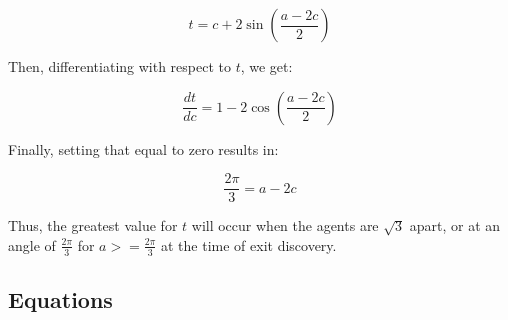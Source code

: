 \documentclass[11pt]{article}
\begin{document}
\begin{flushleft}
\[ t = c + 2 \sin (\frac{a - 2c}{2}) \]

\vspace*{5mm} Then, differentiating with respect to $t$, we get:

\[ \frac{dt}{dc} = 1 - 2 \cos (\frac{a - 2c}{2}) \]

\vspace*{5mm} Finally, setting that equal to zero results in:

\[ \frac{2\pi}{3} = a - 2c \]

\vspace*{5mm} Thus, the greatest value for $t$ will occur when the agents are $\sqrt{3}$ apart,
or at an angle of $ \frac{2\pi}{3}$ for $a >= \frac{2\pi}{3}$ at the time of exit discovery.



\end{flushleft}

\subsection {Equations}
\end{document}
